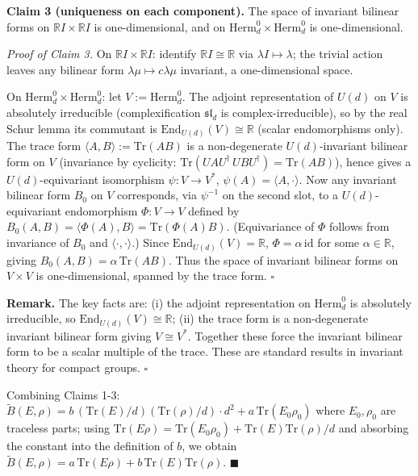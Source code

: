 \documentclass[
]{article}
\begin{document}
\textbf{Claim 3 (uniqueness on each component).} The space of invariant
bilinear forms on \(\mathbb RI\times\mathbb RI\) is one-dimensional, and
on \(\mathrm{Herm}_d^0\times\mathrm{Herm}_d^0\) is one-dimensional.

\emph{Proof of Claim 3.} On \(\mathbb RI\times\mathbb RI\): identify
\(\mathbb RI\cong\mathbb R\) via \(\lambda I\mapsto\lambda\); the
trivial action leaves any bilinear form
\(\lambda\mu\mapsto c\lambda\mu\) invariant, a one-dimensional space.

On \(\mathrm{Herm}_d^0\times\mathrm{Herm}_d^0\): let
\(V:=\mathrm{Herm}_d^0\). The adjoint representation of \(U(d)\) on
\(V\) is absolutely irreducible (complexification \(\mathfrak{sl}_d\) is
complex-irreducible), so by the real Schur lemma its commutant is
\(\mathrm{End}_{U(d)}(V)\cong\mathbb R\) (scalar endomorphisms only).
The trace form \(\langle A,B\rangle:=\mathrm{Tr}(AB)\) is a
non-degenerate \(U(d)\)-invariant bilinear form on \(V\) (invariance by
cyclicity: \(\mathrm{Tr}(UAU^\dagger\,UBU^\dagger)=\mathrm{Tr}(AB)\)),
hence gives a \(U(d)\)-equivariant isomorphism \(\psi:V\to V^*\),
\(\psi(A)=\langle A,\cdot\rangle\). Now any invariant bilinear form
\(B_0\) on \(V\) corresponds, via \(\psi^{-1}\) on the second slot, to a
\(U(d)\)-equivariant endomorphism \(\Phi:V\to V\) defined by
\(B_0(A,B)=\langle\Phi(A),B\rangle=\mathrm{Tr}(\Phi(A)B)\).
(Equivariance of \(\Phi\) follows from invariance of \(B_0\) and
\(\langle\cdot,\cdot\rangle\).) Since
\(\mathrm{End}_{U(d)}(V)=\mathbb R\), \(\Phi=\alpha\,\mathrm{id}\) for
some \(\alpha\in\mathbb R\), giving
\(B_0(A,B)=\alpha\,\mathrm{Tr}(AB)\). Thus the space of invariant
bilinear forms on \(V\times V\) is one-dimensional, spanned by the trace
form. \(\square\)

\textbf{Remark.} The key facts are: (i) the adjoint representation on
\(\mathrm{Herm}_d^0\) is absolutely irreducible, so
\(\mathrm{End}_{U(d)}(V)\cong\mathbb R\); (ii) the trace form is a
non-degenerate invariant bilinear form giving \(V\cong V^*\). Together
these force the invariant bilinear form to be a scalar multiple of the
trace. These are standard results in invariant theory for compact
groups. \(\square\)

Combining Claims 1-3:
\(\widetilde B(E,\rho)=b\,(\mathrm{Tr}(E)/d)(\mathrm{Tr}(\rho)/d)\cdot d^2 + a\,\mathrm{Tr}(E_0\rho_0)\)
where \(E_0,\rho_0\) are traceless parts; using
\(\mathrm{Tr}(E\rho)=\mathrm{Tr}(E_0\rho_0)+\mathrm{Tr}(E)\mathrm{Tr}(\rho)/d\)
and absorbing the constant into the definition of \(b\), we obtain
\(\widetilde B(E,\rho)=a\,\mathrm{Tr}(E\rho)+b\,\mathrm{Tr}(E)\mathrm{Tr}(\rho)\).
\(\blacksquare\)
\end{document}
